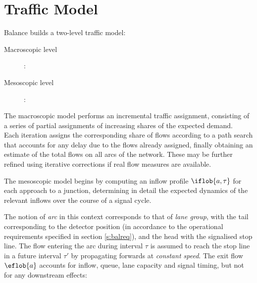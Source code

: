 \section{Traffic Model} \label{s:balancetrafficmodel}
Balance builds a two-level traffic model:
\begin{description}
\item[Macroscopic level]: 
\item[Mesoscopic level]: 
\end{description}

The macroscopic model performs an incremental traffic assignment, consisting of a series of partial assignments of increasing shares of the expected demand.\\
Each iteration assigns the corresponding share of flows according to a path search that accounts for any delay due to the flows already assigned, finally obtaining an estimate of the total flows on all arcs of the network. These may be further refined using iterative corrections if real flow measures are available.


The mesoscopic model begins by computing an inflow profile $\iflob{a,\tau}$ for each approach to a junction, determining in detail the expected dynamics of the relevant inflows over the course of a signal cycle.  

The notion of \emph{arc} in this context corresponds to that of \emph{lane group}, with the tail corresponding to the detector position (in accordance to the operational requirements specified in section \ref{s:balreq}), and the head with the signalised stop line.
The flow entering the arc during interval $\tau$ is assumed to reach the stop line in a future interval $\tau'$ by propagating forwards at \emph{constant speed}.
The exit flow $\eflob{a}$ accounts for inflow, queue, lane capacity and signal timing, but not for any downstream effects:

